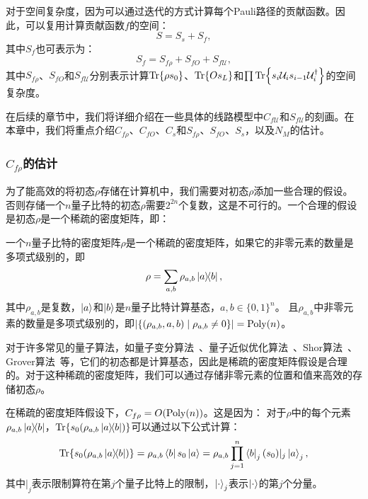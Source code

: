 对于空间复杂度，因为可以通过迭代的方式计算每个Pauli路径的贡献函数。因此，可以复用计算贡献函数$f$的空间：
\begin{equation}\label{eq:space_cost}
    S = S_s+S_f,
\end{equation}
其中$S_f$也可表示为：
\begin{equation}\label{eq:space_f}
    S_f = S_{f\rho}+S_{fO}+S_{f\mathcal{U}},
\end{equation}
其中$S_{f\rho}$、$S_{fO}$和$S_{f\mathcal{U}}$分别表示计算$\Tr{\rho s_0}$、$\Tr{Os_L}$和$\prod\Tr{s_i\mathcal{U}_i s_{i-1}\mathcal{U}_i^\dagger}$的空间复杂度。

在后续的章节中，我们将详细介绍在一些具体的线路模型中$C_{f\mathcal{U}}$和$S_{f\mathcal{U}}$的刻画。在本章中，我们将重点介绍$C_{f\rho}$、$C_{fO}$、$C_s$和$S_{f\rho}$、$S_{fO}$、$S_s$，以及$N_M$的估计。

\subsubsection{$C_{f\rho}$的估计}
为了能高效的将初态$\rho$存储在计算机中，我们需要对初态$\rho$添加一些合理的假设。否则存储一个$n$量子比特的初态$\rho$需要$2^{2n}$个复数，这是不可行的。一个合理的假设是初态$\rho$是一个稀疏的密度矩阵，即：
\begin{definition}\label{def:sparse_density_matrix}
    一个$n$量子比特的密度矩阵$\rho$是一个稀疏的密度矩阵，如果它的非零元素的数量是多项式级别的，即
    \begin{equation}
        \rho=\sum_{a,b} \rho_{a,b}\ketbra{a}{b},
    \end{equation}
    其中$\rho_{a,b}$是复数，$\ket{a}$和$\ket{b}$是$n$量子比特计算基态，$a,b\in \{0,1\}^n$。
    且$\rho_{a,b}$中非零元素的数量是多项式级别的，即$\abs{\{(\rho_{a,b},a,b)\mid \rho_{a,b}\neq 0\}}=\text{Poly}(n)$。
\end{definition}
对于许多常见的量子算法，如量子变分算法~\cite{peruzzo2014variational}、量子近似优化算法~\cite{farhi2014quantum}、Shor算法~\cite{shor1994algorithms}、Grover算法~\cite{grover1996fast}等，它们的初态都是计算基态，因此是稀疏的密度矩阵假设是合理的。对于这种稀疏的密度矩阵，我们可以通过存储非零元素的位置和值来高效的存储初态$\rho$。

在稀疏的密度矩阵假设下，$C_{f\rho}=O(\text{Poly}(n))$。这是因为：
对于$\rho$中的每个元素$\rho_{a,b}\ketbra{a}{b}$，$\Tr{s_0  (\rho_{a,b}\ketbra{a}{b})}$可以通过以下公式计算：
\begin{equation}\label{ap:eq:component_of_input}
\Tr{s_0  (\rho_{a,b}\ketbra{a}{b})}=\rho_{a,b} \bra{b}s_0 \ket{a}=\rho_{a,b} \prod_{j=1}^n \bra{b}_j (s_0)|_j \ket{a}_j,
\end{equation}
其中$|_j$表示限制算符在第$j$个量子比特上的限制，$\ket{\cdot}_j$表示$\ket{\cdot}$的第$j$个分量。

